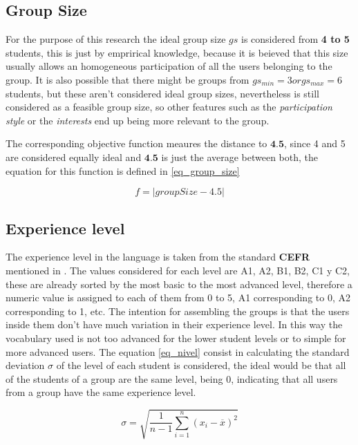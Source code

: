 \subsection{Group Size}

For the purpose of this research the ideal group size $gs$ is considered from \textbf{4 to 5} students, this is just by emprirical knowledge, because it is beieved that this size usually allows an homogeneous participation of all the users belonging to the group. It is also possible that there might be groups from  \textbf{$gs_{min} = 3 or gs_{max} = 6$} students, but these aren't considered ideal group sizes, nevertheless is still considered as a feasible group size, so other features such as the \textit{participation style} or the \textit{interests} end up being more relevant to the group.

The corresponding objective function meaures the distance to $\textbf{4.5}$, since 4 and 5 are considered equally ideal and $\textbf{4.5}$ is just the average between both, the equation for this function is defined in \ref{eq_group_size}

\begin{equation} \label{eq_group_size}
    f = | groupSize - 4.5|
\end{equation}

\subsection{Experience level}

The experience level in the language is taken from the standard \textbf{CEFR} mentioned in \cite{chapter:chapter02}. The values considered for each level are A1, A2, B1, B2, C1 y C2, these are already sorted by the most basic to the most advanced level, therefore a numeric value is assigned to each of them from 0 to 5, A1 corresponding to 0, A2 corresponding to 1, etc. The intention for assembling the groups is that the users inside them don't have much variation in their experience level. In this way the vocabulary used is not too advanced for the lower student levels or to simple for more advanced users. The equation \ref{eq_nivel} consist in calculating the standard deviation $\sigma$ of the level of each student is considered, the ideal would be that all of the students of a group are the same level, being 0, indicating that all users from a group have the same experience level.

\begin{equation} \label{eq_nivel}
    \sigma = \sqrt{\frac{1}{n-1} \sum_{i=1}^n (x_i - \overline{x})^2}
\end{equation}


